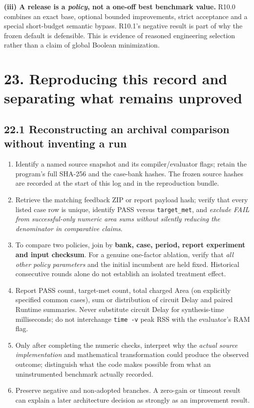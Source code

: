 \documentclass[a4paper,10pt]{article}
\providecommand{\tightlist}{\setlength{\itemsep}{0pt}\setlength{\parskip}{0pt}}
\theoremstyle{definition}
\theoremstyle{remark}
\begin{document}
\textbf{(iii) A release is a \emph{policy}, not a one-off best benchmark value.} R10.0 combines an exact base, optional bounded improvements, strict acceptance and a special short-budget semantic bypass. R10.1's negative result is part of why the frozen default is defensible. This is evidence of reasoned engineering selection rather than a claim of global Boolean minimization.

\section{23. Reproducing this record and separating what remains unproved}\label{reproducing-this-record-and-separating-what-remains-unproved}

\subsection{22.1 Reconstructing an archival comparison without inventing a run}\label{reconstructing-an-archival-comparison-without-inventing-a-run}

\begin{enumerate}
\def\labelenumi{\arabic{enumi}.}
\tightlist
\item
  Identify a named source snapshot and its compiler/evaluator flags; retain the program's full SHA-256 and the case-bank hashes. The frozen source hashes are recorded at the start of this log and in the reproduction bundle.
\item
  Retrieve the matching feedback ZIP or report payload hash; verify that every listed case row is unique, identify PASS versus \texttt{target\_met}, and \emph{exclude FAIL from successful-only numeric area sums without silently reducing the denominator in comparative claims}.
\item
  To compare two policies, join by \textbf{bank, case, period, report experiment and input checksum}. For a genuine one-factor ablation, verify that \emph{all other policy parameters} and the initial incumbent are held fixed. Historical consecutive rounds alone do not establish an isolated treatment effect.
\item
  Report PASS count, target-met count, total charged Area (on explicitly specified common cases), sum or distribution of circuit Delay and paired Runtime summaries. Never substitute circuit Delay for synthesis-time milliseconds; do not interchange \texttt{time\ -v} peak RSS with the evaluator's RAM flag.
\item
  Only after completing the numeric checks, interpret why the \emph{actual source implementation} and mathematical transformation could produce the observed outcome; distinguish what the code makes possible from what an uninstrumented benchmark actually recorded.
\item
  Preserve negative and non-adopted branches. A zero-gain or timeout result can explain a later architecture decision as strongly as an improvement result.
\end{enumerate}
\end{document}
